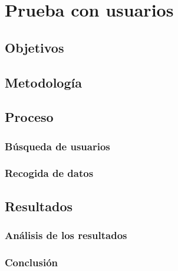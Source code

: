 \newpage
\section {Prueba con usuarios}
\subsection{Objetivos}
\subsection{Metodología}
\subsection{Proceso}
\subsubsection{Búsqueda de usuarios}
\subsubsection{Recogida de datos}
\subsection{Resultados}
\subsubsection{Análisis de los resultados}
\subsubsection{Conclusión}
